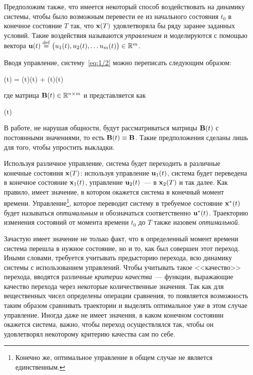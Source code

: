 Предположим также, что имеется некоторый способ воздействовать на динамику системы, чтобы было возможным перевести ее из начального состояния $t_0$ в конечное состояние $T$ так, что $\mathbf{x}(T)$ удовлетворяла бы ряду заранее заданных условий. Такие воздействия называются \emph{управлением} и моделируются с помощью вектора $\mathbf{u}(t) \stackrel{ \mathrm{def} }{=} \bigl(u_1(t), u_2(t), \ldots u_m(t) \bigr) \in \mathbb{R}^{m}$.

Вводя управление, систему~\ref{eq:1/2} можно переписать следующим образом:

    (t) = (t)(t) + (t)(t) \text{,}
\eeq

где матрица $\mathbf{B}(t) \in \mathbb{R}^{{n} \times {m}}$ и представляется как

\beqn
    (t) \eqdef {} 
\eeqn

В работе, не нарушая общности, будут рассматриваться матрицы $\mathbf{B}(t)$ с постоянными значениями, то есть $\mathbf{B}(t) \equiv \mathbf{B}$. Такие предположения сделаны лишь для того, чтобы упростить выкладки.

Используя различное управление, система будет переходить в различные конечные состояния $\mathbf{x}(T)$: используя управление $\mathbf{u}_1(t)$, система будет переведена в конечное состояние $\mathbf{x}_1(t)$, управление $\mathbf{u}_2(t)$~--- в $\mathbf{x}_2(T)$ и так далее. Как правило, имеет значение, в котором окажется система в конечный момент времени. Управление\footnote{Конечно же, оптимальное управление в общем случае не является единственным.}, которое переводит систему в требуемое состояние $\mathbf{x}^{*}(t)$ будет называться \emph{оптимальным} и обозначаться соответственно $\mathbf{u}^{*}(t)$. Траекторию изменения состояний от момента времени $t_0$ до $T$ также назовем \emph{оптимальной}.

\br

Зачастую имеет значение не только факт, что в определенный момент времени система перешла в нужное состояние, но и то, как был совершен этот переход. Иными словами, требуется учитывать предысторию перехода, всю динамику системы с использованием управлений. Чтобы учитывать такое <<качество>> перехода, вводятся различные \emph{критерии качества}~--- функции, выражающие качество перехода через некоторые количественные значения. Так как для вещественных чисел определены операции сравнения, то появляется возможность таким образом сравнивать траектории и выделять оптимальное уже в этом случае управление. Иногда даже не имеет значения, в каком конечном состоянии окажется система, важно, чтобы переход осуществлялся так, чтобы он удовлетворял некоторому критерию качества сам по себе.

